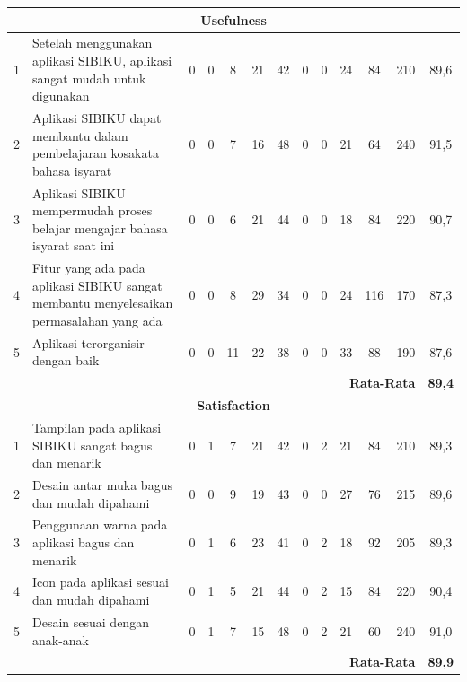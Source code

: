 \documentclass[a4paper,11pt,oneside]{report}
\begin{document}
\begin{landscape}
\begin{longtable}{|c|p{5.5cm}|c|c|c|c|c|c|c|c|c|c|c|}
    \multicolumn{13}{|c|}{\textbf{Usefulness}} \\ \hline
    1 & Setelah menggunakan aplikasi SIBIKU, aplikasi sangat mudah untuk digunakan & 0 & 0 & 8 & 21 & 42 & 0 & 0 & 24 & 84 & 210 & 89,6 \\ \hline
    2 & Aplikasi SIBIKU dapat membantu dalam pembelajaran kosakata bahasa isyarat & 0 & 0 & 7 & 16 & 48 & 0 & 0 & 21 & 64 & 240 & 91,5 \\ \hline
    3 & Aplikasi SIBIKU mempermudah proses belajar mengajar bahasa isyarat saat ini & 0 & 0 & 6 & 21 & 44 & 0 & 0 & 18 & 84 & 220 & 90,7 \\ \hline
    4 & Fitur yang ada pada aplikasi SIBIKU sangat membantu menyelesaikan permasalahan yang ada & 0 & 0 & 8 & 29 & 34 & 0 & 0 & 24 & 116 & 170 & 87,3 \\ \hline
    5 & Aplikasi terorganisir dengan baik & 0 & 0 & 11 & 22 & 38 & 0 & 0 & 33 & 88 & 190 & 87,6 \\ \hline
    \multicolumn{12}{|r|}{\textbf{Rata-Rata}} & \textbf{89,4} \\ \hline
    \multicolumn{13}{|c|}{\textbf{Satisfaction}} \\ \hline
    1 & Tampilan pada aplikasi SIBIKU sangat bagus dan menarik & 0 & 1 & 7 & 21 & 42 & 0 & 2 & 21 & 84 & 210 & 89,3 \\ \hline
    2 & Desain antar muka bagus dan mudah dipahami & 0 & 0 & 9 & 19 & 43 & 0 & 0 & 27 & 76 & 215 & 89,6 \\ \hline
    3 & Penggunaan warna pada aplikasi bagus dan menarik & 0 & 1 & 6 & 23 & 41 & 0 & 2 & 18 & 92 & 205 & 89,3 \\ \hline
    4 & Icon pada aplikasi sesuai dan mudah dipahami & 0 & 1 & 5 & 21 & 44 & 0 & 2 & 15 & 84 & 220 & 90,4 \\ \hline
    5 & Desain sesuai dengan anak-anak & 0 & 1 & 7 & 15 & 48 & 0 & 2 & 21 & 60 & 240 & 91,0 \\ \hline
    \multicolumn{12}{|r|}{\textbf{Rata-Rata}} & \textbf{89,9} \\ \hline
\end{longtable}
\end{landscape}
\end{document}
